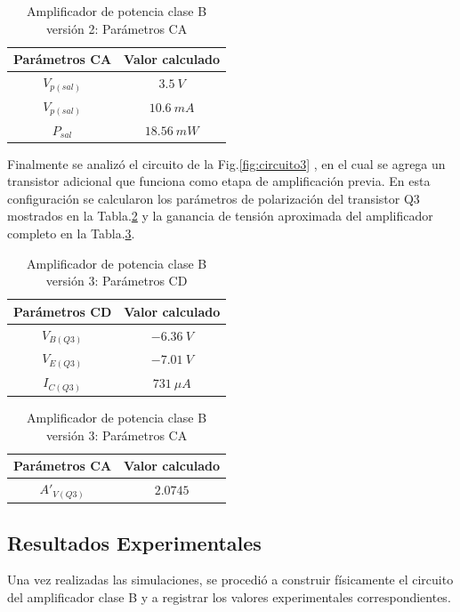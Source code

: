 \documentclass[journal]{IEEEtran}
\begin{document}
\begin{table}[H]
\centering
\caption{Amplificador de potencia clase B versión 2: Parámetros CA}
\label{tab:ca_version2}
\begin{tabular}{|c|c|}
\hline
Parámetros CA & Valor calculado  \\
\hline
$V_{p (sal)}$ & $3.5\ V$ \\
\hline
$V_{p (sal)}$ & $10.6\ mA$ \\
\hline
$P_{sal}$ & $18.56\ mW$ \\
\hline
\end{tabular}
\end{table}

Finalmente se analizó el circuito de la Fig.\ref{fig:circuito3} , en el cual se agrega un transistor adicional que funciona como etapa de amplificación previa. En esta configuración se calcularon los parámetros de polarización del transistor Q3 mostrados en la Tabla.\ref{tab:cd_version3} y la ganancia de tensión aproximada del amplificador completo en la Tabla.\ref{tab:ca_version3}.

\begin{table}[H]
\centering
\caption{Amplificador de potencia clase B versión 3: Parámetros CD}
\label{tab:cd_version3}
\begin{tabular}{|c|c|}
\hline
Parámetros CD & Valor calculado  \\
\hline
$V_{B (Q3)}$ & $-6.36\ V$ \\
\hline
$V_{E (Q3)}$ & $-7.01\ V$ \\
\hline
$I_{C (Q3)}$ & $731\ \mu A$ \\
\hline
\end{tabular}
\end{table}

\begin{table}[H]
\centering
\caption{Amplificador de potencia clase B versión 3: Parámetros CA}
\label{tab:ca_version3}
\begin{tabular}{|c|c|}
\hline
Parámetros CA & Valor calculado  \\
\hline
$A'_{V (Q3)}$ & $2.0745$ \\
\hline
\end{tabular}
\end{table}


\subsection{Resultados Experimentales}

Una vez realizadas las simulaciones, se procedió a construir físicamente el circuito del amplificador clase B y a registrar los valores experimentales correspondientes. \\
\end{document}
